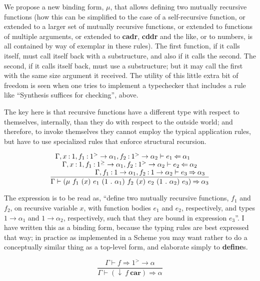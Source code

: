 \documentclass{article}
\begin{document}
We propose a new binding form, $\mu$, that allows defining two mutually
recursive functions (how this can be simplified to the case of a self-recursive
function, or extended to a larger set of mutually recursive functions, or
extended to functions of multiple arguments, or extended to \textbf{cadr},
\textbf{cddr} and the like, or to numbers, is all contained by way of exemplar
in these rules). The first function, if it calls itself, must call itself back
with a substructure, and also if it calls the second. The second, if it calls
itself back, must use a substructure; but it may call the first with the same
size argument it received. The utility of this little extra bit of freedom is
seen when one tries to implement a typechecker that includes a rule like
``Synthesis suffices for checking'', above.

The key here is that recursive functions have a different type with respect to
themselves, internally, than they do with respect to the outside world; and
therefore, to invoke themselves they cannot employ the typical application
rules, but have to use specialized rules that enforce structural recursion.

\[
  \frac{
    \splitfrac{
      \splitfrac{
        \Gamma,x\mathbin{:}1,f_{1}\mathbin{:}1^{>}\to\alpha_{1},f_{2}\mathbin{:}1^{>}\to\alpha_{2}\vdash e_{1}\mathbin{\Leftarrow}\alpha_{1}
      }{
        \Gamma,x\mathbin{:}1,f_{1}\mathbin{:}1^{\geq}\to\alpha_{1},f_{2}\mathbin{:}1^{>}\to\alpha_{2}\vdash e_{2}\mathbin{\Leftarrow}\alpha_{2}
      }
    }{
      \Gamma,f_{1}\mathbin{:}1\to\alpha_{1},f_{2}\mathbin{:}1\to\alpha_{2}\vdash e_{3}\mathbin{\Rightarrow}\alpha_{3}
    }
  }{
    \Gamma\vdash
    (\mu~f_{1}~(x)~e_{1}~(1~.~\alpha_{1})~f_{2}~(x)~e_{2}~(1~.~\alpha_{2})~e_{3})\mathbin{\Rightarrow}\alpha_{3}
  }
\]

The expression is to be read as, ``define two mutually recursive functions,
$f_{1}$ and $f_{2}$, on recursive variable $x$, with function bodies $e_{1}$ and
$e_{2}$, respectively, and types $1\to\alpha_{1}$ and
$1\to\alpha_{2}$, respectively, such that they are bound in
expression $e_{3}$''. I have written this as a binding form, because the typing
rules are best expressed that way; in practice as implemented in a Scheme you
may want rather to do a conceptually similar thing as a top-level form, and
elaborate simply to \textbf{define}s.

\[ \frac{\Gamma\vdash f\mathbin{\Rightarrow}1^{>}\to\alpha}{\Gamma\vdash
    (\downarrow~f~\textbf{car})\mathbin{\Rightarrow}\alpha} \]
\end{document}
